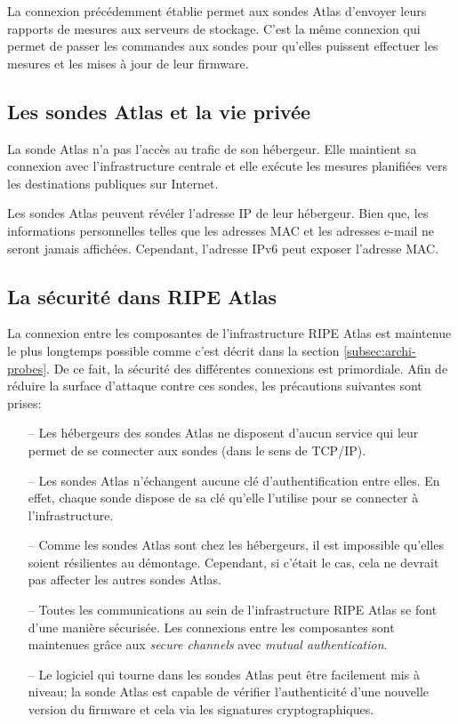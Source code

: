 La connexion précédemment établie permet aux sondes Atlas d'envoyer leurs  rapports de mesures  aux serveurs de stockage. C'est la même connexion qui permet de passer les commandes aux sondes pour qu'elles puissent effectuer les mesures et les mises à jour de leur firmware.




\subsection{Les sondes  Atlas et la vie privée}
La sonde  Atlas n'a pas l'accès au trafic de son hébergeur. Elle maintient sa connexion avec l'infrastructure centrale et elle exécute les mesures planifiées vers les destinations publiques sur Internet. 

Les sondes  Atlas peuvent révéler l'adresse IP de leur hébergeur. Bien que, les informations personnelles telles que les adresses MAC et les adresses e-mail ne seront jamais affichées. Cependant, l'adresse IPv6 peut exposer l'adresse MAC. 

\subsection{La sécurité dans RIPE Atlas}

La connexion entre les composantes de l'infrastructure RIPE Atlas est maintenue le plus longtemps possible comme c'est décrit dans  la section \ref{subsec:archi-probes}. De ce fait, la sécurité des différentes connexions est primordiale. Afin de réduire la surface d'attaque contre ces sondes, les précautions suivantes sont prises:

\begin{itemize}
	\item[--] Les  hébergeurs des sondes  Atlas ne disposent d'aucun service qui leur permet de se connecter aux sondes (dans le sens de TCP/IP).
	\item[--] Les sondes   Atlas n'échangent aucune clé d'authentification entre elles. En effet, chaque sonde dispose de sa clé qu'elle l'utilise pour se connecter à l'infrastructure.
	\item[--] Comme les sondes  Atlas sont chez les hébergeurs, il est impossible qu'elles soient résilientes au démontage. Cependant, si c'était le cas, cela ne devrait pas affecter les autres sondes  Atlas.
	\item[--] Toutes les communications au sein de l'infrastructure RIPE Atlas se font d'une manière sécurisée. Les connexions entre les composantes sont maintenues grâce aux \textit{secure channels} avec \textit{mutual authentication}.
	\item[--] Le logiciel qui tourne dans les sondes  Atlas peut être facilement mis à niveau; la sonde  Atlas est capable de vérifier l'authenticité d'une nouvelle version du firmware et cela via les signatures cryptographiques. 
\end{itemize}

